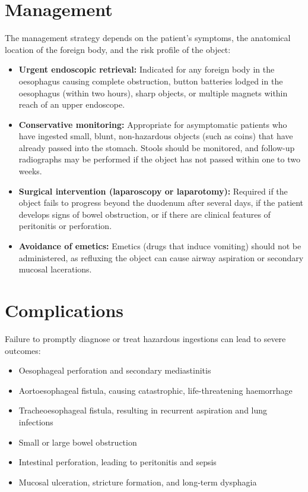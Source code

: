\section*{Management}
The management strategy depends on the patient's symptoms, the anatomical location of the foreign body, and the risk profile of the object:
\begin{itemize}
    \item \textbf{Urgent endoscopic retrieval:} Indicated for any foreign body in the oesophagus causing complete obstruction, button batteries lodged in the oesophagus (within two hours), sharp objects, or multiple magnets within reach of an upper endoscope.
    \item \textbf{Conservative monitoring:} Appropriate for asymptomatic patients who have ingested small, blunt, non-hazardous objects (such as coins) that have already passed into the stomach. Stools should be monitored, and follow-up radiographs may be performed if the object has not passed within one to two weeks.
    \item \textbf{Surgical intervention (laparoscopy or laparotomy):} Required if the object fails to progress beyond the duodenum after several days, if the patient develops signs of bowel obstruction, or if there are clinical features of peritonitis or perforation.
    \item \textbf{Avoidance of emetics:} Emetics (drugs that induce vomiting) should not be administered, as refluxing the object can cause airway aspiration or secondary mucosal lacerations.
\end{itemize}

\section*{Complications}
Failure to promptly diagnose or treat hazardous ingestions can lead to severe outcomes:
\begin{itemize}
    \item Oesophageal perforation and secondary mediastinitis
    \item Aortoesophageal fistula, causing catastrophic, life-threatening haemorrhage
    \item Tracheoesophageal fistula, resulting in recurrent aspiration and lung infections
    \item Small or large bowel obstruction
    \item Intestinal perforation, leading to peritonitis and sepsis
    \item Mucosal ulceration, stricture formation, and long-term dysphagia
\end{itemize}

